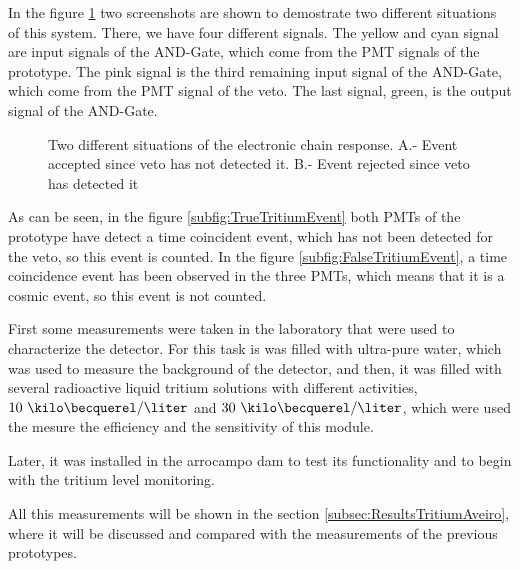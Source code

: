 In the figure \ref{fig:ScreenshotElectronic} two screenshots are shown to demostrate two different situations of this system. There, we have four different signals. The yellow and cyan signal are input signals of the AND-Gate, which come from the PMT signals of the prototype. The pink signal is the third remaining input signal of the AND-Gate, which come from the PMT signal of the veto. The last signal, green, is the output signal of the AND-Gate.

\begin{figure}[h]
 \centering
 \caption{Two different situations of the electronic chain response. A.- Event accepted since veto has not detected it. B.- Event rejected since veto has detected it}
 \label{fig:ScreenshotElectronic}
\end{figure}

As can be seen, in the figure \ref{subfig:TrueTritiumEvent} both PMTs of the prototype have detect a time coincident event, which has not been detected for the veto, so this event is counted. In the figure \ref{subfig:FalseTritiumEvent}, a time coincidence event has been observed in the three PMTs, which means that it is a cosmic event, so this event is not counted.

First some measurements were taken in the laboratory that were used to characterize the detector. For this task is was filled with ultra-pure water, which was used to measure the background of the detector, and then, it was filled with several radioactive liquid tritium solutions with different activities, $10~\kilo\becquerel/\liter$ and $30~\kilo\becquerel/\liter$, which were used the mesure the efficiency and the sensitivity of this module.

Later, it was installed in the arrocampo dam to test its functionality and to begin with the tritium level monitoring.

All this measurements will be shown in the section \ref{subsec:ResultsTritiumAveiro}, where it will be discussed and compared with the measurements of the previous prototypes.

